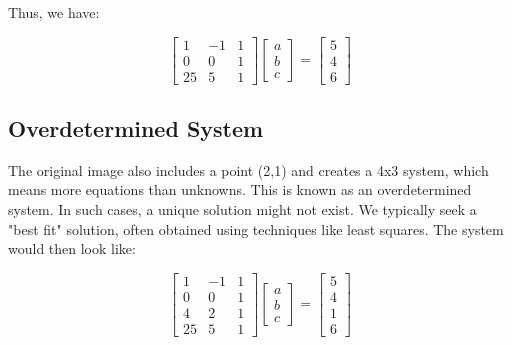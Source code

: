 \documentclass{report}
\begin{document}
Thus, we have:

$$
	\begin{bmatrix} 1 & -1 & 1 \\ 0 & 0 & 1 \\ 25 & 5 & 1 \end{bmatrix}
	\begin{bmatrix} a \\ b \\ c \end{bmatrix}
	=
	\begin{bmatrix} 5 \\ 4 \\ 6 \end{bmatrix}
$$


\subsection{Overdetermined System}
The original image also includes a point (2,1) and creates a 4x3 system, which means more equations than unknowns. This is known as an overdetermined system. In such cases, a unique solution might not exist. We typically seek a "best fit" solution, often obtained using techniques like least squares. The system would then look like:

$$
	\begin{bmatrix} 1 & -1 & 1 \\ 0 & 0 & 1 \\ 4 & 2 & 1 \\ 25 & 5 & 1 \end{bmatrix}
	\begin{bmatrix} a \\ b \\ c \end{bmatrix}
	=
	\begin{bmatrix} 5 \\ 4 \\ 1 \\ 6 \end{bmatrix}
$$

\end{document}
